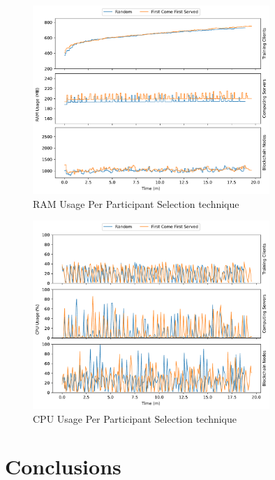 \begin{figure}[!hpt]
    \centering
    \centering
    \includegraphics[width=0.8\textwidth]{graphics/02_selection_ram.pdf}
    \caption{RAM Usage Per Participant Selection technique}
    \label{fig:ram_selection}
\end{figure}

\begin{figure}[!hpb]
    \centering
    \centering
    \includegraphics[width=0.8\textwidth]{graphics/02_selection_cpu.pdf}
    \caption{CPU Usage Per Participant Selection technique}
    \label{fig:cpu_selection}
\end{figure}

\section{Conclusions} %
